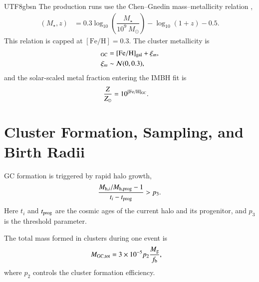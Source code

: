 \documentclass[trackchanges, twocolappendix, twocolumn]{aastex701}
\begin{document}
\begin{CJK*}{UTF8}{gbsn}
The production runs use the Chen--Gnedin mass--metallicity relation \citep{Chen&Gnedin2024aGC},
\begin{align}
[\mathrm{Fe} / \mathrm{H}] (M_\star, z) & = 0.3 \log_{10} \left( \dfrac{M_\star}{10^9~M_\odot} \right) - \log_{10} (1 + z) - 0.5 .
\label{eq:mass-metal}
\end{align}
This relation is capped at $[\mathrm{Fe}/\mathrm{H}]=0.3$. The cluster metallicity is
\begin{align}
[\mathrm{Fe}/\mathrm{H}]_{\rm GC}
&=[\mathrm{Fe}/\mathrm{H}]_{\rm gal}+\xi_m,\\
\xi_m &\sim {\cal N}(0,0.3),
\end{align}
and the solar-scaled metal fraction entering the IMBH fit is
\begin{align}
\dfrac{Z}{Z_{\odot}} &= 10^{[\mathrm{Fe}/\mathrm{H}]_{\rm GC}}.
\end{align}

\section{Cluster Formation, Sampling, and Birth Radii}
\label{app:cluster_initial_equations}

GC formation is triggered by rapid halo growth,
\begin{align}
\dfrac{M_{{\rm h},i}/M_{{\rm h},{\rm prog}}-1}
{t_i-t_{\rm prog}} > p_3 .
\end{align}
Here $t_i$ and $t_{\rm prog}$ are the cosmic ages of the current halo and its progenitor, and $p_3$ is the threshold parameter.

The total mass formed in clusters during one event is
\begin{align}
M_{\rm GC, tot} & = 3\times10^{-5}p_2\dfrac{M_{\rm g}}{f_{\rm b}},
\end{align}
where $p_2$ controls the cluster formation efficiency.


\end{CJK*}
\end{document}
